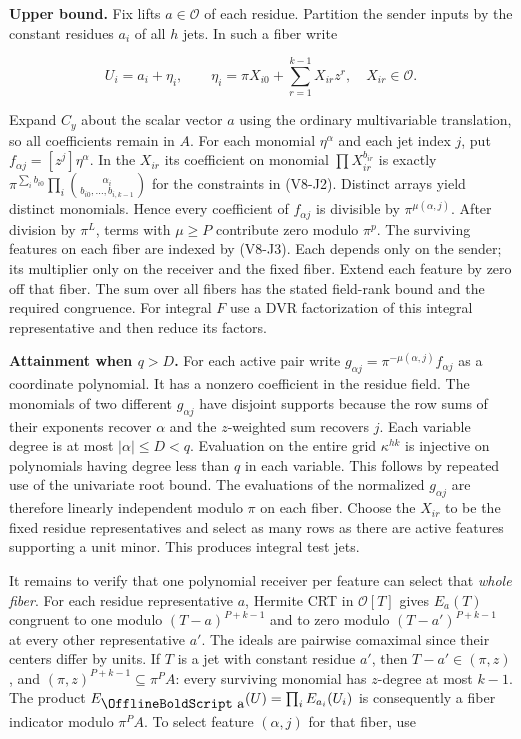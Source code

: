 \documentclass[11pt,a4paper]{article}
\renewcommand{\boldsymbol}[1]{\mathord{\mathchoice
  {\hbox{\OfflineBoldText #1}}{\hbox{\OfflineBoldText #1}}
  {\hbox{\OfflineBoldScript #1}}{\hbox{\OfflineBoldScriptScript #1}}}}
\begin{document}
\textbf{Upper bound.} Fix lifts \(a\in\mathcal O\) of each residue.
Partition the sender inputs by the constant residues \(a_i\) of all
\(h\) jets. In such a fiber write

\[
     U_i=a_i+\eta_i,\qquad
     \eta_i=\pi X_{i0}+\sum_{r=1}^{k-1}X_{ir}z^r,\quad X_{ir}\in\mathcal O.
\]

Expand \(C_y\) about the scalar vector \(a\) using the ordinary
multivariable translation, so all coefficients remain in \(A\). For each
monomial \(\eta^\alpha\) and each jet index \(j\), put
\(f_{\alpha j}=[z^j]\eta^\alpha\). In the \(X_{ir}\) its coefficient on
monomial \(\prod X_{ir}^{b_{ir}}\) is exactly
\(\pi^{\sum_i b_{i0}}\prod_i{\alpha_i\choose b_{i0},\ldots,b_{i,k-1}}\)
for the constraints in (V8-J2). Distinct arrays yield distinct monomials.
Hence every coefficient of \(f_{\alpha j}\) is divisible by
\(\pi^{\mu(\alpha,j)}\). After division by \(\pi^L\), terms with
\(\mu\ge P\) contribute zero modulo \(\pi^p\). The surviving features on
each fiber are indexed by (V8-J3). Each depends only on the sender; its
multiplier only on the receiver and the fixed fiber. Extend each feature
by zero off that fiber. The sum over all fibers has the stated
field-rank bound and the required congruence. For integral \(F\) use a
DVR factorization of this integral representative and then reduce its
factors.

\textbf{Attainment when \(q>D\).} For each active pair write
\(g_{\alpha j}=\pi^{-\mu(\alpha,j)} f_{\alpha j}\) as a coordinate
polynomial. It has a nonzero coefficient in the residue field. The
monomials of two different \(g_{\alpha j}\) have disjoint supports
because the row sums of their exponents recover \(\alpha\) and the
\(z\)-weighted sum recovers \(j\). Each variable degree is at most
\(|\alpha|\le D<q\). Evaluation on the entire grid \(\kappa^{hk}\) is
injective on polynomials having degree less than \(q\) in each variable.
This follows by repeated use of the univariate root bound. The
evaluations of the normalized \(g_{\alpha j}\) are therefore linearly
independent modulo \(\pi\) on each fiber. Choose the \(X_{ir}\) to be
the fixed residue representatives and select as many rows as there are
active features supporting a unit minor. This produces integral test
jets.

It remains to verify that one polynomial receiver per feature can select
that \emph{whole fiber}. For each residue representative \(a\), Hermite
CRT in \(\mathcal O[T]\) gives \(E_a(T)\) congruent to one modulo
\((T-a)^{P+k-1}\) and to zero modulo \((T-a')^{P+k-1}\) at every other
representative \(a'\). The ideals are pairwise comaximal since their
centers differ by units. If \(T\) is a jet with constant residue \(a'\),
then \(T-a'\in(\pi,z)\), and \((\pi,z)^{P+k-1}\subseteq\pi^P A\): every
surviving monomial has \(z\)-degree at most \(k-1\). The product
\(E_{\boldsymbol a}(U)=\prod_i E_{a_i}(U_i)\) is consequently a fiber
indicator modulo \(\pi^P A\). To select feature \((\alpha,j)\) for that
fiber, use
\end{document}
